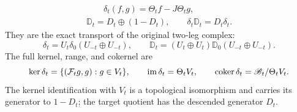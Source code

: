 \documentclass[11pt]{article}
\begin{document}
\begin{hdtproposition}
\begin{equation}
\begin{gathered}
 \qquad\delta_t(f,g)=\Theta_tf-J\Theta_tg,\\
 \mathbb D_t=D_t\oplus(1-D_t),
 \qquad\delta_t\mathbb D_t=D_t\delta_t.
 \end{gathered}
\end{equation}
They are the exact transport of the original two-leg complex:
\begin{equation}\label{hdt:wt:eq:two-leg-conjugacy}
 \delta_t=U_t\delta_0(U_{-t}\oplus U_{-t}),\qquad
 \mathbb D_t=(U_t\oplus U_t)\mathbb D_0
                         (U_{-t}\oplus U_{-t}).
\end{equation}
The full kernel, range, and cokernel are
\begin{equation}\label{hdt:wt:eq:two-leg-kernel}
 \ker\delta_t=\{(\mathcal F_tg,g):g\in V_t\},\qquad
 \operatorname{im}\delta_t=\Theta_tV_t,\qquad
 \operatorname{coker}\delta_t=\mathscr B_t/\Theta_tV_t.
\end{equation}
The kernel identification with $V_t$ is a topological isomorphism
and carries its generator to $1-D_t$; the target quotient has
the descended generator $D_t$.
\end{hdtproposition}
\end{document}
